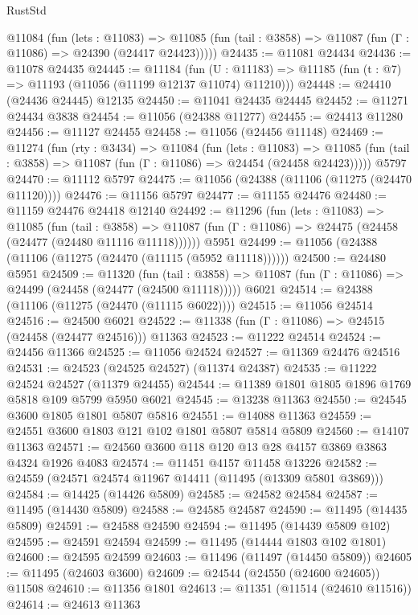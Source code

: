 \begin{lexlean}{RustStd}
\begin{coremodule}
    @11084
      (fun (lets : @11083) =>
      @11085 (fun (tail : @3858) => @11087 (fun (Γ : @11086) => @24390 (@24417 @24423)))))
@24435 := @11081 @24434
@24436 := @11078 @24435
@24445 := @11184
    (fun (U : @11183) => @11185 (fun (t : @7) => @11193 (@11056 (@11199 @12137 @11074) @11210)))
@24448 := @24410 (@24436 @24445) @12135
@24450 := @11041 @24435 @24445
@24452 := @11271 @24434 @3838
@24454 := @11056 (@24388 @11277)
@24455 := @24413 @11280
@24456 := @11127 @24455
@24458 := @11056 (@24456 @11148)
@24469 := @11274
    (fun (rty : @3434) =>
    @11084
      (fun (lets : @11083) =>
      @11085 (fun (tail : @3858) => @11087 (fun (Γ : @11086) => @24454 (@24458 @24423)))))
    @5797
@24470 := @11112 @5797
@24475 := @11056 (@24388 (@11106 (@11275 (@24470 @11120))))
@24476 := @11156 @5797
@24477 := @11155 @24476
@24480 := @11159 @24476 @24418 @12140
@24492 := @11296
    (fun (lets : @11083) =>
    @11085
      (fun (tail : @3858) =>
      @11087 (fun (Γ : @11086) => @24475 (@24458 (@24477 (@24480 @11116 @11118))))))
    @5951
@24499 := @11056 (@24388 (@11106 (@11275 (@24470 (@11115 (@5952 @11118))))))
@24500 := @24480 @5951
@24509 := @11320
    (fun (tail : @3858) => @11087 (fun (Γ : @11086) => @24499 (@24458 (@24477 (@24500 @11118)))))
    @6021
@24514 := @24388 (@11106 (@11275 (@24470 (@11115 @6022))))
@24515 := @11056 @24514
@24516 := @24500 @6021
@24522 := @11338 (fun (Γ : @11086) => @24515 (@24458 (@24477 @24516))) @11363
@24523 := @11222 @24514
@24524 := @24456 @11366
@24525 := @11056 @24524
@24527 := @11369 @24476 @24516
@24531 := @24523 (@24525 @24527) (@11374 @24387)
@24535 := @11222 @24524 @24527 (@11379 @24455)
@24544 := @11389 @1801 @1805 @1896 @1769 @5818 @109 @5799 @5950 @6021
@24545 := @13238 @11363
@24550 := @24545 @3600 @1805 @1801 @5807 @5816
@24551 := @14088 @11363
@24559 := @24551 @3600 @1803 @121 @102 @1801 @5807 @5814 @5809
@24560 := @14107 @11363
@24571 := @24560 @3600 @118 @120 @13 @28 @4157 @3869 @3863 @4324 @1926 @4083
@24574 := @11451 @4157 @11458 @13226
@24582 := @24559 (@24571 @24574 @11967 @14411 (@11495 (@13309 @5801 @3869)))
@24584 := @14425 (@14426 @5809)
@24585 := @24582 @24584
@24587 := @11495 (@14430 @5809)
@24588 := @24585 @24587
@24590 := @11495 (@14435 @5809)
@24591 := @24588 @24590
@24594 := @11495 (@14439 @5809 @102)
@24595 := @24591 @24594
@24599 := @11495 (@14444 @1803 @102 @1801)
@24600 := @24595 @24599
@24603 := @11496 (@11497 (@14450 @5809))
@24605 := @11495 (@24603 @3600)
@24609 := @24544 (@24550 (@24600 @24605)) @11508
@24610 := @11356 @1801
@24613 := @11351 (@11514 (@24610 @11516))
@24614 := @24613 @11363

\end{coremodule}
\end{lexlean}
